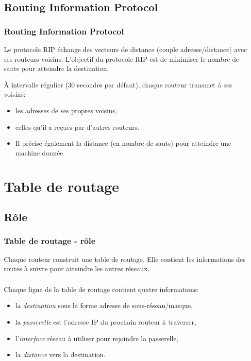 \documentclass[svgnames,11pt]{beamer}
\begin{document}
\subsection{Routing Information Protocol}

\begin{frame}
    \frametitle{Routing Information Protocol}

    \begin{aretenir}[]
        Le protocole RIP échange des vecteurs de distance (couple adresse/distance) avec ses routeurs voisins. L’objectif du protocole RIP est de minimiser le nombre de sauts pour atteindre la destination.
    \end{aretenir}

\end{frame}
\begin{frame}

    À intervalle régulier (30 secondes par défaut), chaque routeur transmet à ses voisins:
    \begin{itemize}
        \item<1-> les adresses de ses propres voisins,
        \item<2-> celles qu’il a reçues par d’autres routeurs.
        \item<3-> Il précise également la distance (en
        nombre de sauts) pour atteindre une machine donnée.
    \end{itemize}

\end{frame}
\section{Table de routage}
\subsection{Rôle}
\begin{frame}
    \frametitle{Table de routage - rôle}
\begin{center}
        Chaque routeur construit une table de routage. Elle contient les informations des routes à suivre pour atteindre les autres réseaux.
\end{center}
    

\end{frame}
\begin{frame}
    \frametitle{}

    Chaque ligne de la table de routage contient quatre informations:
\begin{itemize}
    \item<1-> la \emph{destination} sous la forme adresse de sous-réseau/masque,
    \item<2-> la \emph{passerelle} est l'adresse IP du prochain routeur à traverser,
    \item<3-> l'\emph{interface} réseau à utiliser pour rejoindre la passerelle,
    \item<4-> la \emph{distance} vers la destination.
\end{itemize}

\end{frame}
\end{document}
